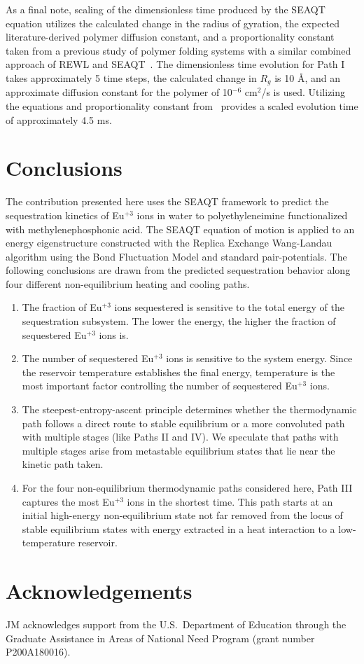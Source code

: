 \documentclass[
journal=jcisd8, %
manuscript=article,
layout=twocolumn   %
]{achemso}
\begin{document}
As a final note, scaling of the dimensionless time produced by the SEAQT equation utilizes the calculated change in the radius of gyration, the expected literature-derived polymer diffusion constant, and a proportionality constant taken from a previous study of polymer folding systems with a similar combined approach of REWL and SEAQT~\cite{McDonald2023polymer}. The dimensionless time evolution for Path I takes approximately 5 time steps, the calculated change in $R_g$ is 10 \AA, and an approximate diffusion constant for the polymer of 10$^{-6}$ cm$^2$/s is used. Utilizing the equations and proportionality constant from~\cite{McDonald2023polymer} provides a scaled evolution time of approximately 4.5 ms.

\section{Conclusions}\label{Conclusions}   

The contribution presented here uses the SEAQT framework to predict the sequestration kinetics of Eu$^{+3}$ ions in water to polyethyleneimine functionalized with methylenephosphonic acid. The SEAQT equation of motion is applied to an energy eigenstructure constructed with the Replica Exchange Wang-Landau algorithm using the Bond Fluctuation Model and standard pair-potentials. The following conclusions are drawn from the predicted sequestration behavior along four different non-equilibrium heating and cooling paths.

\begin{enumerate}
\item The fraction of Eu$^{+3}$ ions sequestered  is sensitive to the total energy of the sequestration subsystem. The lower the energy, the higher the fraction of sequestered Eu$^{+3}$ ions is.

\item The number of sequestered Eu$^{+3}$ ions is sensitive to the system energy.  Since the reservoir temperature establishes the final energy, temperature is the most important factor controlling the number of sequestered Eu$^{+3}$ ions.

\item The steepest-entropy-ascent principle determines whether the thermodynamic path follows a direct route to stable equilibrium or a more convoluted path with multiple stages (like Paths II and IV). We speculate that paths with multiple stages arise from metastable equilibrium states that lie near the kinetic path taken.

\item For the four non-equilibrium thermodynamic paths considered here, Path III captures the most Eu$^{+3}$ ions in the shortest time. This path starts at an initial high-energy non-equilibrium state not far removed from the locus of stable equilibrium states with energy extracted in a heat interaction to a low-temperature reservoir.  

\end{enumerate}


\section{Acknowledgements}
JM acknowledges support from the U.S.~Department of Education through the Graduate Assistance in Areas of National Need Program
(grant number P200A180016).

\end{document}
